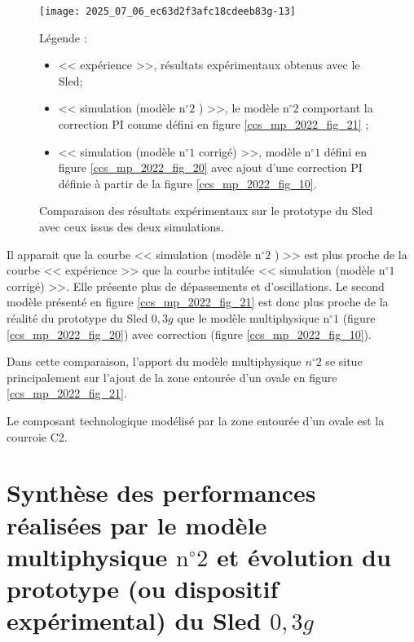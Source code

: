 \begin{figure}[!h]
\centering

\texttt{[image: 2025\_07\_06\_ec63d2f3afc18cdeeb83g-13]}

\caption{\label{ccs_mp_2022_fig_18}Comparaison des résultats expérimentaux sur le prototype du Sled avec ceux issus des deux simulations. }
Légende :

\begin{itemize}
  \item << expérience >>, résultats expérimentaux obtenus avec le Sled;
  \item << simulation (modèle $\mathrm{n}^{\circ} 2$ ) >>, le modèle $\mathrm{n}^{\circ} 2$ comportant la correction PI comme défini en figure \ref{ccs_mp_2022_fig_21} ;
  \item << simulation (modèle $\mathrm{n}^{\circ} 1$ corrigé) >>, modèle $\mathrm{n}^{\circ} 1$ défini en figure \ref{ccs_mp_2022_fig_20} avec ajout d'une correction PI définie à partir de la figure \ref{ccs_mp_2022_fig_10}.
\end{itemize}
\end{figure}


Il apparait que la courbe << simulation (modèle $\mathrm{n}^{\circ} 2$ ) >> est plus proche de la courbe << expérience >> que la courbe intitulée << simulation (modèle $\mathrm{n}^{\circ} 1$ corrigé) >>. Elle présente plus de dépassements et d'oscillations. Le second modèle présenté en figure \ref{ccs_mp_2022_fig_21} est donc plus proche de la réalité du prototype du Sled $0,3 g$ que le modèle multiphysique $\mathrm{n}^{\circ} 1$ (figure \ref{ccs_mp_2022_fig_20}) avec correction (figure \ref{ccs_mp_2022_fig_10}).

Dans cette comparaison, l'apport du modèle multiphysique $n^{\circ} 2$ se situe principalement sur l'ajout de la zone entourée d'un ovale en figure \ref{ccs_mp_2022_fig_21}.
\fi


\ifprof
\begin{corrige}
Le composant technologique modélisé par la zone entourée d'un ovale est la courroie C2.
\end{corrige}
\else
\fi

\section{Synthèse des performances réalisées par le modèle multiphysique $\mathrm{n}^{\circ} 2$ et évolution du prototype (ou dispositif expérimental) du Sled $0,3 g$ \label{ccs_mp_2022_sec_5}}


